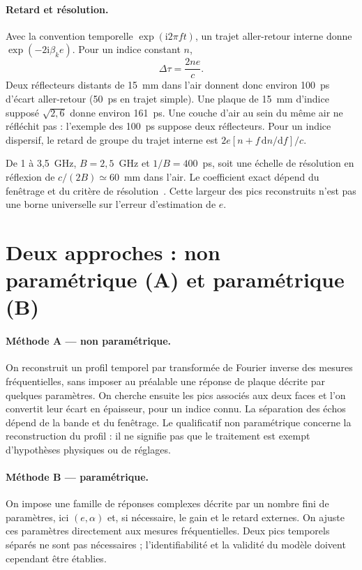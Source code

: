 \documentclass[11pt,a4paper]{article}
\newcommand{\ii}{\mathrm{i}}
\begin{document}
\paragraph{Retard et résolution.}
Avec la convention temporelle $\exp(\ii2\pi ft)$, un trajet aller-retour
interne donne $\exp(-2\ii\beta_ke)$. Pour un indice constant $n$,
\begin{equation}
 \Delta\tau=\frac{2ne}{c}.
\end{equation}
Deux réflecteurs distants de 15~mm dans l'air donnent donc environ 100~ps
d'écart aller-retour (50~ps en trajet simple). Une plaque de 15~mm d'indice
supposé $\sqrt{2{,}6}$ donne environ 161~ps. Une couche d'air au sein du
même air ne réfléchit pas : l'exemple des 100~ps suppose deux réflecteurs.
Pour un indice dispersif, le retard de groupe du trajet interne est
$2e[n+f\,\mathrm{d}n/\mathrm{d}f]/c$.

De 1 à 3,5~GHz, $B=2{,}5$~GHz et $1/B=400$~ps, soit une échelle de
résolution en réflexion de $c/(2B)\simeq60$~mm dans l'air. Le coefficient
exact dépend du fenêtrage et du critère de résolution~\cite{keysight}.
Cette largeur des pics reconstruits n'est pas une borne universelle
sur l'erreur d'estimation de $e$.

\section{Deux approches : non paramétrique (A) et paramétrique (B)}

\paragraph{Méthode A --- non paramétrique.}
On reconstruit un profil temporel par transformée de Fourier inverse des
mesures fréquentielles, sans imposer au préalable une réponse de plaque
décrite par quelques paramètres. On cherche ensuite les pics associés aux
deux faces et l'on convertit leur écart en épaisseur, pour un indice connu.
La séparation des échos dépend de la bande et du fenêtrage. Le qualificatif
non paramétrique concerne la reconstruction du profil : il ne signifie pas
que le traitement est exempt d'hypothèses physiques ou de réglages.

\paragraph{Méthode B --- paramétrique.}
On impose une famille de réponses complexes décrite par un nombre fini de
paramètres, ici $(e,\alpha)$ et, si nécessaire, le gain et le retard externes.
On ajuste ces paramètres directement aux mesures fréquentielles. Deux pics
temporels séparés ne sont pas nécessaires ; l'identifiabilité et la validité
du modèle doivent cependant être établies.
\end{document}
